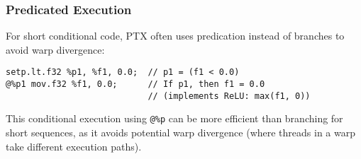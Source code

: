 \subsubsection{Predicated Execution}

For short conditional code, PTX often uses predication instead of branches to avoid warp divergence:

\begin{lstlisting}[style=ptx]
setp.lt.f32 %p1, %f1, 0.0;  // p1 = (f1 < 0.0)
@%p1 mov.f32 %f1, 0.0;      // If p1, then f1 = 0.0
                            // (implements ReLU: max(f1, 0))
\end{lstlisting}

This conditional execution using \texttt{@\%p} can be more efficient than branching for short sequences, as it avoids potential warp divergence (where threads in a warp take different execution paths).

